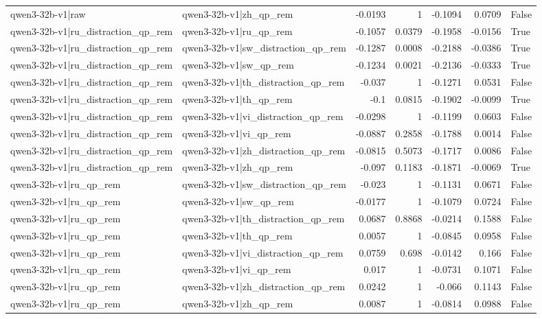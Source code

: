 \begin{table}
\begin{tabular}{l l r r r r l}
qwen3-32b-v1|raw & qwen3-32b-v1|zh_qp_rem & -0.0193 & 1 & -0.1094 & 0.0709 & False \\
qwen3-32b-v1|ru_distraction_qp_rem & qwen3-32b-v1|ru_qp_rem & -0.1057 & 0.0379 & -0.1958 & -0.0156 & True \\
qwen3-32b-v1|ru_distraction_qp_rem & qwen3-32b-v1|sw_distraction_qp_rem & -0.1287 & 0.0008 & -0.2188 & -0.0386 & True \\
qwen3-32b-v1|ru_distraction_qp_rem & qwen3-32b-v1|sw_qp_rem & -0.1234 & 0.0021 & -0.2136 & -0.0333 & True \\
qwen3-32b-v1|ru_distraction_qp_rem & qwen3-32b-v1|th_distraction_qp_rem & -0.037 & 1 & -0.1271 & 0.0531 & False \\
qwen3-32b-v1|ru_distraction_qp_rem & qwen3-32b-v1|th_qp_rem & -0.1 & 0.0815 & -0.1902 & -0.0099 & True \\
qwen3-32b-v1|ru_distraction_qp_rem & qwen3-32b-v1|vi_distraction_qp_rem & -0.0298 & 1 & -0.1199 & 0.0603 & False \\
qwen3-32b-v1|ru_distraction_qp_rem & qwen3-32b-v1|vi_qp_rem & -0.0887 & 0.2858 & -0.1788 & 0.0014 & False \\
qwen3-32b-v1|ru_distraction_qp_rem & qwen3-32b-v1|zh_distraction_qp_rem & -0.0815 & 0.5073 & -0.1717 & 0.0086 & False \\
qwen3-32b-v1|ru_distraction_qp_rem & qwen3-32b-v1|zh_qp_rem & -0.097 & 0.1183 & -0.1871 & -0.0069 & True \\
qwen3-32b-v1|ru_qp_rem & qwen3-32b-v1|sw_distraction_qp_rem & -0.023 & 1 & -0.1131 & 0.0671 & False \\
qwen3-32b-v1|ru_qp_rem & qwen3-32b-v1|sw_qp_rem & -0.0177 & 1 & -0.1079 & 0.0724 & False \\
qwen3-32b-v1|ru_qp_rem & qwen3-32b-v1|th_distraction_qp_rem & 0.0687 & 0.8868 & -0.0214 & 0.1588 & False \\
qwen3-32b-v1|ru_qp_rem & qwen3-32b-v1|th_qp_rem & 0.0057 & 1 & -0.0845 & 0.0958 & False \\
qwen3-32b-v1|ru_qp_rem & qwen3-32b-v1|vi_distraction_qp_rem & 0.0759 & 0.698 & -0.0142 & 0.166 & False \\
qwen3-32b-v1|ru_qp_rem & qwen3-32b-v1|vi_qp_rem & 0.017 & 1 & -0.0731 & 0.1071 & False \\
qwen3-32b-v1|ru_qp_rem & qwen3-32b-v1|zh_distraction_qp_rem & 0.0242 & 1 & -0.066 & 0.1143 & False \\
qwen3-32b-v1|ru_qp_rem & qwen3-32b-v1|zh_qp_rem & 0.0087 & 1 & -0.0814 & 0.0988 & False \\

\end{tabular}
\end{table}
